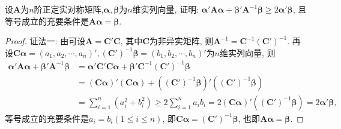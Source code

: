 \documentclass[../../main.tex]{subfiles}
\begin{document}
\begin{example}
设$\boldsymbol{A}$为$n$阶正定实对称矩阵,$\boldsymbol{\alpha}, \boldsymbol{\beta}$为$n$维实列向量, 证明: $\boldsymbol{\alpha}'\boldsymbol{A}\boldsymbol{\alpha}+\boldsymbol{\beta}'\boldsymbol{A}^{-1}\boldsymbol{\beta}\geq 2\boldsymbol{\alpha}'\boldsymbol{\beta}$, 且等号成立的充要条件是$\boldsymbol{A}\boldsymbol{\alpha}=\boldsymbol{\beta}$.
\end{example}
\begin{proof}
{\color{blue}证法一:}
由可设$\boldsymbol{A}=\boldsymbol{C}'\boldsymbol{C}$, 其中$\boldsymbol{C}$为非异实矩阵, 则$\boldsymbol{A}^{-1}=\boldsymbol{C}^{-1}(\boldsymbol{C}')^{-1}$. 再设$\boldsymbol{C}\boldsymbol{\alpha}=(a_1, a_2, \cdots, a_n)', (\boldsymbol{C}')^{-1}\boldsymbol{\beta}=(b_1, b_2, \cdots, b_n)'$为$n$维实列向量, 则
\begin{align*}
\boldsymbol{\alpha}'\boldsymbol{A}\boldsymbol{\alpha}+\boldsymbol{\beta}'\boldsymbol{A}^{-1}\boldsymbol{\beta} 
&= \boldsymbol{\alpha}'\boldsymbol{C}'\boldsymbol{C}\boldsymbol{\alpha}+\boldsymbol{\beta}'\boldsymbol{C}^{-1}(\boldsymbol{C}')^{-1}\boldsymbol{\beta}\\
&= (\boldsymbol{C}\boldsymbol{\alpha})'(\boldsymbol{C}\boldsymbol{\alpha})+((\boldsymbol{C}')^{-1}\boldsymbol{\beta})'((\boldsymbol{C}')^{-1}\boldsymbol{\beta})\\
&= \sum_{i = 1}^n (a_i^2 + b_i^2)\geq 2\sum_{i = 1}^n a_ib_i = 2(\boldsymbol{C}\boldsymbol{\alpha})'((\boldsymbol{C}')^{-1}\boldsymbol{\beta}) = 2\boldsymbol{\alpha}'\boldsymbol{\beta},
\end{align*}
等号成立的充要条件是$a_i = b_i (1\leq i\leq n)$, 即$\boldsymbol{C}\boldsymbol{\alpha}=(\boldsymbol{C}')^{-1}\boldsymbol{\beta}$, 也即$\boldsymbol{A}\boldsymbol{\alpha}=\boldsymbol{\beta}$. 


\end{proof}
\end{document}
